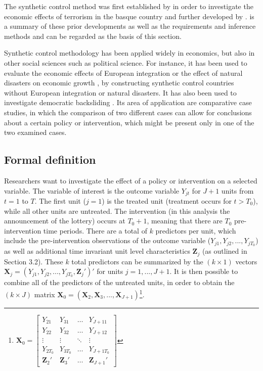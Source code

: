 \documentclass{scrbook}
\begin{document}
The synthetic control method was first established by
\textcite{abadie_economic_2003} in order to investigate the economic
effects of terrorism in the basque country and further developed by
\textcite{abadie_synthetic_2010}. \textcite{abadie_using_2021} is a
summary of these prior developments as well as the requirements and
inference methods and can be regarded as the basis of this section.

Synthetic control methodology has been applied widely in economics, but
also in other social sciences such as political science. For instance,
it has been used to evaluate the economic effects of European
integration \parencite{campos_institutional_2019} or the effect of
natural disasters on economic growth
\parencite{cavallo_catastrophic_2013}, by constructing synthetic control
countries without European integration or natural disasters. It has also
been used to investigate democratic backsliding
\parencite{meyerrose_unintended_2020}. Its area of application are
comparative case studies, in which the comparison of two different cases
can allow for conclusions about a certain policy or intervention, which
might be present only in one of the two examined cases.

\subsection*{Formal definition}

Researchers want to investigate the effect of a policy or intervention
on a selected variable. The variable of interest is the outcome variable
\(Y_{jt}\) for \(J + 1\) units from \(t=1\) to \(T\). The first unit
(\(j = 1\)) is the treated unit (treatment occurs for \(t>T_{0}\)),
while all other units are untreated. The intervention (in this analysis
the announcement of the lottery) occurs at \(T_{0}+1\), meaning that
there are \(T_{0}\) pre-intervention time periods. There are a total of
\(k\) predictors per unit, which include the pre-intervention
observations of the outcome variable (\(Y_{j1},Y_{j2},...,Y_{jT_{0}}\))
as well as additional time invariant unit level characteristics
\(\mathbf{Z}_{j}\) (as outlined in Section 3.2). These \(k\) total
predictors can be summarized by the \((k\times 1)\) vectors
\(\mathbf{X}_{j}=(Y_{j1},Y_{j2},...,Y_{jT_{0}},\mathbf{Z}_{j}')'\) for
units \(j=1,...,J + 1\). It is then possible to combine all of the
predictors of the untreated units, in order to obtain the
\((k\times J)\) matrix
\(\mathbf{X}_{0}=(\mathbf{X}_{2},\mathbf{X}_{3},...,\mathbf{X}_{J + 1})\)\footnote{\(\mathbf{X}_0=
\begin{bmatrix}
Y_{21} & Y_{31} & \dots & Y_{J+11}\\
Y_{22} & Y_{32} & \dots & Y_{J+12}\\
\vdots & \vdots & \ddots & \vdots\\
Y_{2T_{0}} & Y_{3T_{0}} & \dots & Y_{J+1T_{0}}\\
\mathbf{Z}_{2}' & \mathbf{Z}_{3}' & \dots & \mathbf{Z}_{J + 1}'
\end{bmatrix}\)}.
\end{document}
